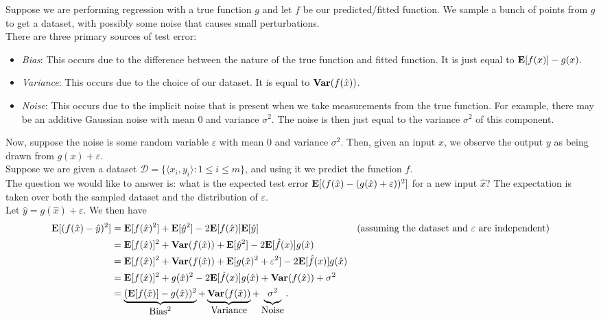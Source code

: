 \documentclass{article}
\begin{document}
			Suppose we are performing regression with a true function $g$ and let $f$ be our predicted/fitted function. We sample a bunch of points from $g$ to get a dataset, with possibly some noise that causes small perturbations.\\
			There are three primary sources of test error:
			\begin{itemize}
				\item \emph{Bias}: This occurs due to the difference between the nature of the true function and fitted function. It is just equal to $\textbf{E}[f(x)] - g(x)$.
				\item \emph{Variance}: This occurs due to the choice of our dataset. It is equal to $\operatorname{\textbf{Var}}(f(\hat{x}))$.
				\item \emph{Noise}: This occurs due to the implicit noise that is present when we take measurements from the true function. For example, there may be an additive Gaussian noise with mean $0$ and variance $\sigma^2$. The noise is then just equal to the variance $\sigma^2$ of this component.
			\end{itemize}

			Now, suppose the noise is some random variable $\varepsilon$ with mean $0$ and variance $\sigma^2$. Then, given an input $x$, we observe the output $y$ as being drawn from $g(x)+\varepsilon$.\\
			Suppose we are given a dataset $\mathcal{D} = \{\langle x_i,y_i\rangle : 1 \le i\le m\}$, and using it we predict the function $f$.\\
			The question we would like to answer is: what is the expected test error $\textbf{E}[(f(\hat{x}) - (g(\hat{x}) + \varepsilon))^2]$ for a new input $\hat{x}$? The expectation is taken over both the sampled dataset and the distribution of $\varepsilon$.\\
			Let $\hat{y} = g(\hat{x}) + \varepsilon$. We then have
			\begin{align*}
				\textbf{E}[(f(\hat{x}) - \hat{y})^2] &= \textbf{E}[f(\hat{x})^2] + \textbf{E}[\hat{y}^2] - 2 \textbf{E}[f(\hat{x})]\textbf{E}[\hat{y}] & \text{(assuming the dataset and $\varepsilon$ are independent)} \\
					&= \textbf{E}[f(\hat{x})]^2 + \operatorname{\textbf{Var}}(f(\hat{x})) + \textbf{E}[\hat{y}^2] - 2 \textbf{E}[\hat{f}(x)] g(\hat{x}) \\
					&= \textbf{E}[f(\hat{x})]^2 + \operatorname{\textbf{Var}}(f(\hat{x})) + \textbf{E}[g(\hat{x})^2 + \varepsilon^2] - 2 \textbf{E}[\hat{f}(x)] g(\hat{x}) \\
					&= \textbf{E}[f(\hat{x})]^2  + g(\hat{x})^2 - 2 \textbf{E}[\hat{f}(x)] g(\hat{x}) + \operatorname{\textbf{Var}}(f(\hat{x})) + \sigma^2 \\
					&= \underbrace{(\textbf{E}[f(\hat{x})] - g(\hat{x}))^2}_{\textstyle\text{Bias$^2$}} + \underbrace{\operatorname{\textbf{Var}}(f(\hat{x}))}_{\textstyle\text{Variance}} + \underbrace{\sigma^2 \mathstrut}_{\textstyle\text{Noise}}.
			\end{align*}
\end{document}
